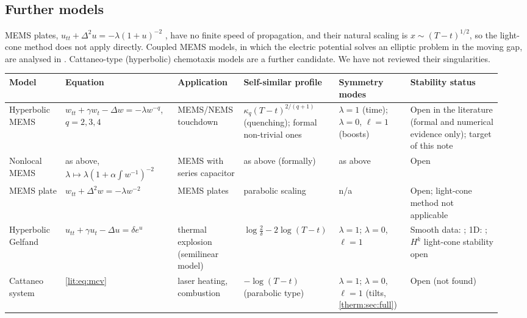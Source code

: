 \subsection{Further models}
\label{lit:other}
MEMS plates, $u_{tt}+\Delta^2u=-\lambda(1+u)^{-2}$
\cite{LaurencotWalker2014,LaurencotWalker2017}, have no finite speed of
propagation, and their natural scaling is $x\sim(T-t)^{1/2}$, so the
light-cone method does not apply directly. Coupled MEMS models, in which
the electric potential solves an elliptic problem in the moving gap, are
analysed in \cite{He2021,LaurencotWalker2017}. Cattaneo-type (hyperbolic)
chemotaxis models are a further candidate. %
We have not reviewed their singularities.

\begin{table}[htbp]
\centering
\scriptsize
\setlength{\tabcolsep}{2pt}
\renewcommand{\arraystretch}{1.15}
\begin{tabular}{@{}p{0.11\linewidth}p{0.22\linewidth}p{0.12\linewidth}p{0.17\linewidth}p{0.14\linewidth}p{0.18\linewidth}@{}}
\toprule
\raggedright Model & \raggedright Equation & \raggedright Application & \raggedright Self-similar profile & \raggedright Symmetry modes & \raggedright Stability status \tabularnewline
\midrule
\raggedright Hyperbolic MEMS & \raggedright $w_{tt}+\gamma w_t-\Delta w=-\lambda w^{-q}$, $q=2,3,4$ & \raggedright MEMS/NEMS touchdown & \raggedright $\kappa_q(T-t)^{2/(q+1)}$ (quenching); formal non-trivial ones \cite{GimperleinHeLacey2022} & \raggedright $\lambda=1$ (time); $\lambda=0$, $\ell=1$ (boosts) & \raggedright Open in the literature (formal and numerical evidence only); target of this note \tabularnewline
\raggedright Nonlocal MEMS & \raggedright as above, $\lambda\mapsto\lambda(1+\alpha\!\int\! w^{-1})^{-2}$ & \raggedright MEMS with series capacitor & \raggedright as above (formally) & \raggedright as above & \raggedright Open \tabularnewline
\raggedright MEMS plate & \raggedright $w_{tt}+\Delta^2w=-\lambda w^{-2}$ & \raggedright MEMS plates & \raggedright parabolic scaling & \raggedright n/a & \raggedright Open; light-cone method not applicable \tabularnewline
\raggedright Hyperbolic Gelfand & \raggedright $u_{tt}+\gamma u_t-\Delta u=\delta e^u$ & \raggedright thermal explosion (semilinear model) & \raggedright $\log\frac2\delta-2\log(T-t)$ & \raggedright $\lambda=1$; $\lambda=0$, $\ell=1$ & \raggedright Smooth data: \cite{Kichenassamy1996}; 1D: \cite{Godin2000,AzaiezMasmoudiZaag2016}; $H^k$ light-cone stability open \tabularnewline
\raggedright Cattaneo system & \raggedright \eqref{lit:eq:mcv} & \raggedright laser heating, combustion & \raggedright $-\log(T-t)$ (parabolic type) & \raggedright $\lambda=1$; $\lambda=0$, $\ell=1$ (tilts, \cref{therm:sec:full}) & \raggedright Open (not found) \tabularnewline

\end{tabular}
\end{table}
